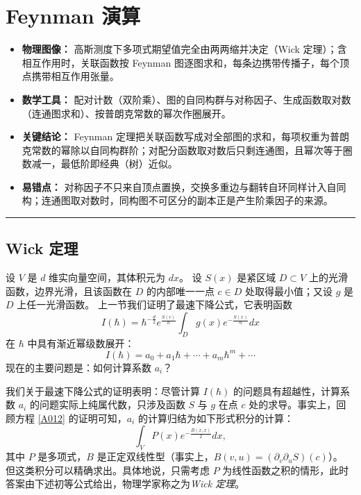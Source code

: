 \section{Feynman 演算}

\begin{keytakeaways}
\begin{itemize}
  \item \textbf{物理图像：} 高斯测度下多项式期望值完全由两两缩并决定（Wick 定理）；含相互作用时，关联函数按 Feynman 图逐图求和，每条边携带传播子，每个顶点携带相互作用张量。
  \item \textbf{数学工具：} 配对计数（双阶乘）、图的自同构群与对称因子、生成函数取对数（连通图求和）、按普朗克常数的幂次作圈展开。
  \item \textbf{关键结论：} Feynman 定理把关联函数写成对全部图的求和，每项权重为普朗克常数的幂除以自同构群阶；对配分函数取对数后只剩连通图，且幂次等于圈数减一，最低阶即经典（树）近似。
  \item \textbf{易错点：} 对称因子不只来自顶点置换，交换多重边与翻转自环同样计入自同构；连通图取对数时，同构图不可区分的副本正是产生阶乘因子的来源。
\end{itemize}
\end{keytakeaways}

\bigskip
\noindent\rule{\textwidth}{0.6pt}
\bigskip

\subsection{Wick 定理}
设 $V$ 是 $d$ 维实向量空间，其体积元为 $dx$。
设 $S(x)$ 是紧区域 $D\subset V$ 上的光滑函数，边界光滑，且该函数在 $D$ 的内部唯一一点 $c\in D$ 处取得最小值；又设 $g$ 是 $D$ 上任一光滑函数。
上一节我们证明了最速下降公式，它表明函数
$$
I(\hbar)=\hbar^{-\frac{d}{2}}e^{\frac{S(c)}{\hbar}}\int_{D}g(x)e^{-\frac{S(x)}{\hbar}}dx
$$
在 $\hbar$ 中具有渐近幂级数展开：
\begin{equation}\label{A012}
I(\hbar)=a_0+a_1\hbar+ \cdots +a_m\hbar^m+ \cdots
\end{equation}
现在的主要问题是：如何计算系数 $a_i$？

我们关于最速下降公式的证明表明：尽管计算 $I(\hbar)$ 的问题具有超越性，计算系数 $a_i$ 的问题实际上纯属代数，只涉及函数 $S$ 与 $g$ 在点 $c$ 处的求导。事实上，回顾方程 \eqref{A012} 的证明可知，$a_i$ 的计算归结为如下形式积分的计算：
$$
\int_{V}P(x)e^{-\frac{B(x,x)}{2}}dx,
$$
其中 $P$ 是多项式，$B$ 是正定双线性型（事实上，$B(v,u)=(\partial_v\partial_uS)(c)$）。
但这类积分可以精确求出。具体地说，只需考虑 $P$ 为线性函数之积的情形，此时答案由下述初等公式给出，物理学家称之为\emph{Wick 定理}。

